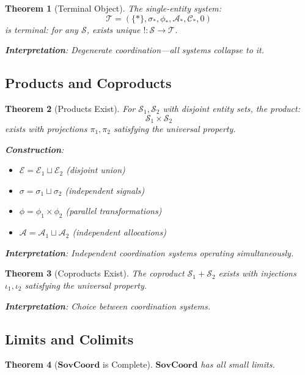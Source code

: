 \documentclass[11pt,a4paper]{article}
\newtheorem{theorem}{Theorem}[section]
\theoremstyle{definition}
\theoremstyle{remark}
\newcommand{\E}{\mathcal{E}}
\newcommand{\A}{\mathcal{A}}
\newcommand{\C}{\mathcal{C}}
\newcommand{\SovCoord}{\mathbf{SovCoord}}
\begin{document}
\begin{theorem}[Terminal Object]
The single-entity system:
\[ \mathcal{T} = (\{*\}, \sigma_*, \phi_*, \A_*, \C_*, 0) \]
is terminal: for any $\mathcal{S}$, exists unique $! : \mathcal{S} \to \mathcal{T}$.

\textbf{Interpretation}: Degenerate coordination—all systems collapse to it.
\end{theorem}

\subsection{Products and Coproducts}

\begin{theorem}[Products Exist]
For $\mathcal{S}_1, \mathcal{S}_2$ with disjoint entity sets, the product:
\[ \mathcal{S}_1 \times \mathcal{S}_2 \]
exists with projections $\pi_1, \pi_2$ satisfying the universal property.

\textbf{Construction}:
\begin{itemize}
\item $\E = \E_1 \sqcup \E_2$ (disjoint union)
\item $\sigma = \sigma_1 \sqcup \sigma_2$ (independent signals)
\item $\phi = \phi_1 \times \phi_2$ (parallel transformations)
\item $\A = \A_1 \sqcup \A_2$ (independent allocations)
\end{itemize}

\textbf{Interpretation}: Independent coordination systems operating simultaneously.
\end{theorem}

\begin{theorem}[Coproducts Exist]
The coproduct $\mathcal{S}_1 + \mathcal{S}_2$ exists with injections $\iota_1, \iota_2$ satisfying the universal property.

\textbf{Interpretation}: Choice between coordination systems.
\end{theorem}

\subsection{Limits and Colimits}

\begin{theorem}[$\SovCoord$ is Complete]
\label{thm:complete}
$\SovCoord$ has all small limits.
\end{theorem}
\end{document}
